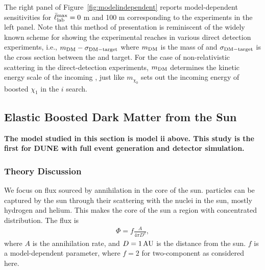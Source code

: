 The right panel of Figure~\ref{fig:modelindependent} reports model-dependent sensitivities for $\bar{\ell}_{\rm lab}^{\rm max} = 0$ m and 100 m corresponding to the experiments in the left panel.
Note that this %
method of presentation is reminiscent of the widely known scheme for showing the experimental reaches in various  direct detection experiments, i.e., $m_{\rm DM} - \sigma_{\rm DM - target}$ where $m_{\rm DM}$ is the mass of  and $\sigma_{\rm DM - target}$ is the cross section between the  and target. 
For the case of non-relativistic  scattering in the direct-detection experiments, $m_{\rm DM}$ determines the kinetic energy scale of the incoming , just like $m_{\chi_0}$ sets out the incoming energy of boosted $\chi_1$ in the $i$ search. 

\subsection{Elastic Boosted Dark Matter from the Sun \label{sec:FDsun}}

{\bf The model studied in this section is model ii above. This study is the first for DUNE with full event generation and detector simulation.}

\subsubsection{\label{sec:level2}Theory Discussion}

We focus on  flux sourced by  annihilation in the core of the sun.   particles can be captured by the sun through their scattering with the nuclei in the sun, mostly hydrogen and helium. This makes the core of the sun a region with concentrated  distribution. The  flux is
\begin{eqnarray} \label{eq:fluxbdm}
\Phi= f \frac{A}{4\pi D^2},
\end{eqnarray}
where $A$ is the annihilation rate, and $D = 1\,\rm{AU}$ is the distance from the sun. $f$ is a model-dependent parameter, where $f = 2$ for two-component  as considered here.

